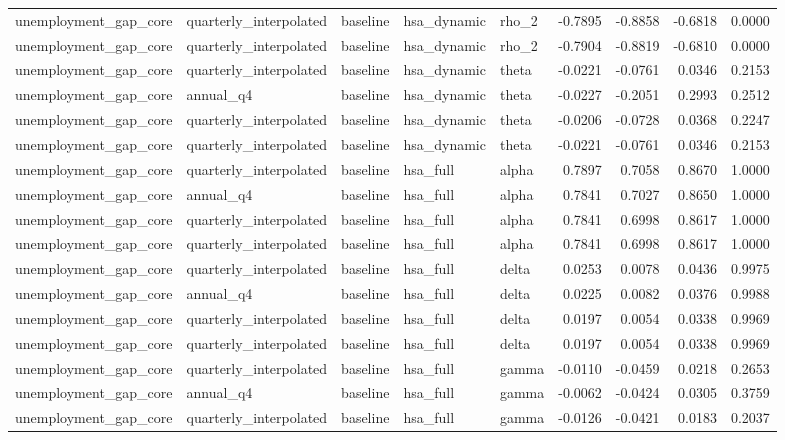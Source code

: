 \begin{tabular}{lllllrrrr}
unemployment\_gap\_core & quarterly\_interpolated & baseline & hsa\_dynamic & rho\_2 & -0.7895 & -0.8858 & -0.6818 & 0.0000 \\
unemployment\_gap\_core & quarterly\_interpolated & baseline & hsa\_dynamic & rho\_2 & -0.7904 & -0.8819 & -0.6810 & 0.0000 \\
unemployment\_gap\_core & quarterly\_interpolated & baseline & hsa\_dynamic & theta & -0.0221 & -0.0761 & 0.0346 & 0.2153 \\
unemployment\_gap\_core & annual\_q4 & baseline & hsa\_dynamic & theta & -0.0227 & -0.2051 & 0.2993 & 0.2512 \\
unemployment\_gap\_core & quarterly\_interpolated & baseline & hsa\_dynamic & theta & -0.0206 & -0.0728 & 0.0368 & 0.2247 \\
unemployment\_gap\_core & quarterly\_interpolated & baseline & hsa\_dynamic & theta & -0.0221 & -0.0761 & 0.0346 & 0.2153 \\
unemployment\_gap\_core & quarterly\_interpolated & baseline & hsa\_full & alpha & 0.7897 & 0.7058 & 0.8670 & 1.0000 \\
unemployment\_gap\_core & annual\_q4 & baseline & hsa\_full & alpha & 0.7841 & 0.7027 & 0.8650 & 1.0000 \\
unemployment\_gap\_core & quarterly\_interpolated & baseline & hsa\_full & alpha & 0.7841 & 0.6998 & 0.8617 & 1.0000 \\
unemployment\_gap\_core & quarterly\_interpolated & baseline & hsa\_full & alpha & 0.7841 & 0.6998 & 0.8617 & 1.0000 \\
unemployment\_gap\_core & quarterly\_interpolated & baseline & hsa\_full & delta & 0.0253 & 0.0078 & 0.0436 & 0.9975 \\
unemployment\_gap\_core & annual\_q4 & baseline & hsa\_full & delta & 0.0225 & 0.0082 & 0.0376 & 0.9988 \\
unemployment\_gap\_core & quarterly\_interpolated & baseline & hsa\_full & delta & 0.0197 & 0.0054 & 0.0338 & 0.9969 \\
unemployment\_gap\_core & quarterly\_interpolated & baseline & hsa\_full & delta & 0.0197 & 0.0054 & 0.0338 & 0.9969 \\
unemployment\_gap\_core & quarterly\_interpolated & baseline & hsa\_full & gamma & -0.0110 & -0.0459 & 0.0218 & 0.2653 \\
unemployment\_gap\_core & annual\_q4 & baseline & hsa\_full & gamma & -0.0062 & -0.0424 & 0.0305 & 0.3759 \\
unemployment\_gap\_core & quarterly\_interpolated & baseline & hsa\_full & gamma & -0.0126 & -0.0421 & 0.0183 & 0.2037 \\

\end{tabular}
